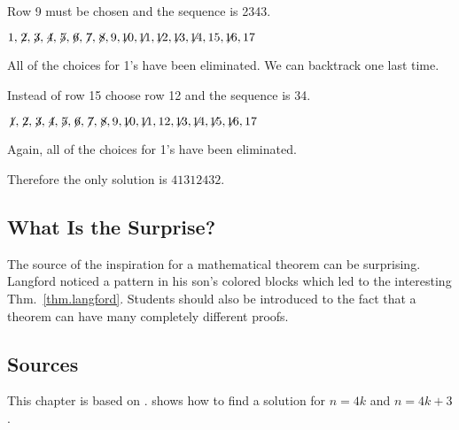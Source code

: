 \noindent Row 9 must be chosen and the sequence is 2{}34{}3.

$1,\not\! 2,\not\! 3,\not\! 4,\not\! 5,\not\! 6,\not\! 7,\not\! 8,9,\not\!\! 10,\not\!\! 11,\not\!\! 12,\not\!\! 13,\not\!\! 14,15,\not\!\! 16,17$

\noindent All of the choices for 1's have been eliminated. We can backtrack one last time. 

\smallskip

\noindent Instead of row 15 choose row 12 and the sequence is 3{}4\textvisiblespace {}.

$\not\! 1,\not\! 2,\not\! 3,\not\! 4,\not\! 5,\not\! 6,\not\! 7,\not\! 8,9,\not\!\! 10,\not\!\! 11,12,\not\!\! 13,\not\!\! 14,\not\!\! 15,\not\!\! 16,17$

\noindent Again, all of the choices for 1's have been eliminated.

\medskip

\noindent Therefore the only solution is $41312432$.

\subsection*{What Is the Surprise?}

The source of the inspiration for a mathematical theorem can be surprising. Langford noticed a pattern in his son's colored blocks which led to the interesting Thm.~\ref{thm.langford}. Students should also be introduced to the fact that a theorem  can have many completely different proofs.

\subsection*{Sources}
This chapter is based on \cite{miller}. \cite{davies} shows how to find a solution for $n=4k$ and $n=4k+3$.
